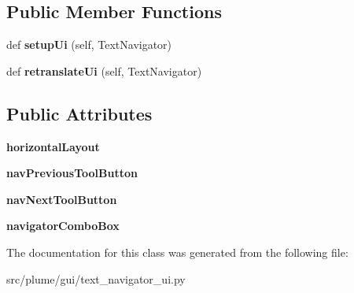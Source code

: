 \subsection*{Public Member Functions}
\begin{DoxyCompactItemize}
\item 
def {\bfseries setup\+Ui} (self, Text\+Navigator)\hypertarget{classplume-creator_1_1src_1_1plume_1_1gui_1_1text__navigator__ui_1_1_ui___text_navigator_a73d52b8b0325e4015634ab3bd0882aaa}{}\label{classplume-creator_1_1src_1_1plume_1_1gui_1_1text__navigator__ui_1_1_ui___text_navigator_a73d52b8b0325e4015634ab3bd0882aaa}

\item 
def {\bfseries retranslate\+Ui} (self, Text\+Navigator)\hypertarget{classplume-creator_1_1src_1_1plume_1_1gui_1_1text__navigator__ui_1_1_ui___text_navigator_aa561542d1922dcd9ccb739a14701e190}{}\label{classplume-creator_1_1src_1_1plume_1_1gui_1_1text__navigator__ui_1_1_ui___text_navigator_aa561542d1922dcd9ccb739a14701e190}

\end{DoxyCompactItemize}
\subsection*{Public Attributes}
\begin{DoxyCompactItemize}
\item 
{\bfseries horizontal\+Layout}\hypertarget{classplume-creator_1_1src_1_1plume_1_1gui_1_1text__navigator__ui_1_1_ui___text_navigator_ae58643bf16adaba64e6fa5b2c45e6987}{}\label{classplume-creator_1_1src_1_1plume_1_1gui_1_1text__navigator__ui_1_1_ui___text_navigator_ae58643bf16adaba64e6fa5b2c45e6987}

\item 
{\bfseries nav\+Previous\+Tool\+Button}\hypertarget{classplume-creator_1_1src_1_1plume_1_1gui_1_1text__navigator__ui_1_1_ui___text_navigator_a2df727aaa7abab20bfcb79103b8d06d9}{}\label{classplume-creator_1_1src_1_1plume_1_1gui_1_1text__navigator__ui_1_1_ui___text_navigator_a2df727aaa7abab20bfcb79103b8d06d9}

\item 
{\bfseries nav\+Next\+Tool\+Button}\hypertarget{classplume-creator_1_1src_1_1plume_1_1gui_1_1text__navigator__ui_1_1_ui___text_navigator_a289466a010917e6e6ccc9e1c6f9fa7eb}{}\label{classplume-creator_1_1src_1_1plume_1_1gui_1_1text__navigator__ui_1_1_ui___text_navigator_a289466a010917e6e6ccc9e1c6f9fa7eb}

\item 
{\bfseries navigator\+Combo\+Box}\hypertarget{classplume-creator_1_1src_1_1plume_1_1gui_1_1text__navigator__ui_1_1_ui___text_navigator_a81b907d9ca24015bb404540d5045df67}{}\label{classplume-creator_1_1src_1_1plume_1_1gui_1_1text__navigator__ui_1_1_ui___text_navigator_a81b907d9ca24015bb404540d5045df67}

\end{DoxyCompactItemize}


The documentation for this class was generated from the following file\+:\begin{DoxyCompactItemize}
\item 
src/plume/gui/text\+\_\+navigator\+\_\+ui.\+py\end{DoxyCompactItemize}
